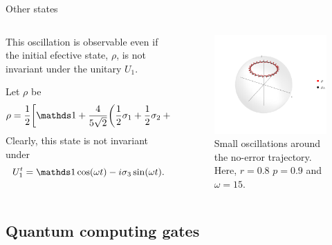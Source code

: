 \begin{frame}{Other states}
    \begin{columns}
        \begin{column}{0.5\textwidth}
            This oscillation is observable even if the initial efective state, $\rho$, is not invariant under the unitary $U_{1}$.
            
            Let $\rho$ be
            \begin{equation*}
                \rho=\frac{1}{2}\qty[\Id+\frac{4}{5\sqrt{2}}\qty(\frac{1}{2}\pauli{1}+\frac{1}{2}\pauli{2}+\pauli{3})]
            \end{equation*}
            Clearly, this state is not invariant under 
            \begin{equation*}
                U_{1}^{t}=\Id\cos(\omega t) - i \pauli{3} \sin(\omega t).
            \end{equation*}
        \end{column}
        \begin{column}{0.5\textwidth}
            \begin{figure}[h!]
                \includegraphics[width=0.8\columnwidth]{figures/U1xU2_H1=(sz)_H2=15(sx-sy)_z=0.8_p=0.9_wXY=0.5.png}%
                \caption{Small oscillations around the no-error trajectory. Here, $r=0.8$ $p=0.9$ and $\omega=15$. }
            \end{figure}
        \end{column}
    \end{columns}
\end{frame}



\subsection{Quantum computing gates}

